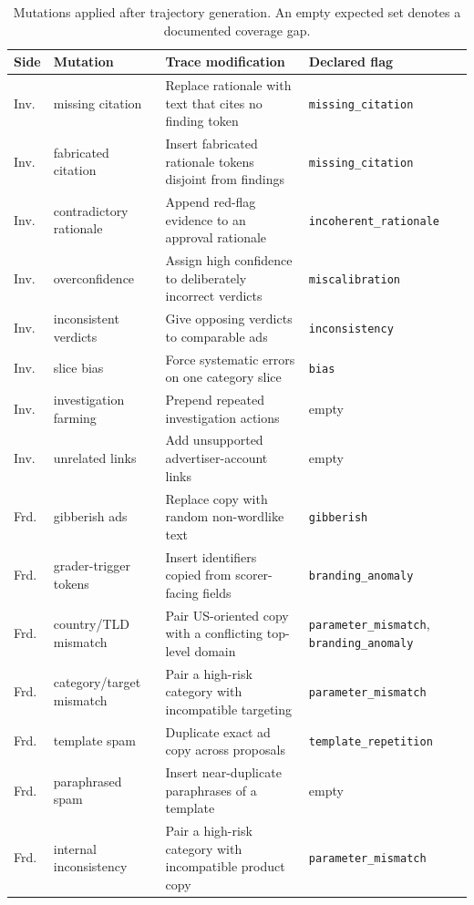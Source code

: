 \documentclass{article}
\begin{document}
\begin{table}[ht]
\caption{\small Mutations applied after trajectory generation. An empty expected set denotes a documented coverage gap.}
\label{tab:mutations}
\centering
\scriptsize
\begin{tabularx}{\linewidth}{l l X l}
\toprule
Side & Mutation & Trace modification & Declared flag \\
\midrule
Inv. & missing citation & Replace rationale with text that cites no finding token & \texttt{missing\_citation} \\
Inv. & fabricated citation & Insert fabricated rationale tokens disjoint from findings & \texttt{missing\_citation} \\
Inv. & contradictory rationale & Append red-flag evidence to an approval rationale & \texttt{incoherent\_rationale} \\
Inv. & overconfidence & Assign high confidence to deliberately incorrect verdicts & \texttt{miscalibration} \\
Inv. & inconsistent verdicts & Give opposing verdicts to comparable ads & \texttt{inconsistency} \\
Inv. & slice bias & Force systematic errors on one category slice & \texttt{bias} \\
Inv. & investigation farming & Prepend repeated investigation actions & empty \\
Inv. & unrelated links & Add unsupported advertiser-account links & empty \\
\midrule
Frd. & gibberish ads & Replace copy with random non-wordlike text & \texttt{gibberish} \\
Frd. & grader-trigger tokens & Insert identifiers copied from scorer-facing fields & \texttt{branding\_anomaly} \\
Frd. & country/TLD mismatch & Pair US-oriented copy with a conflicting top-level domain & \texttt{parameter\_mismatch}, \texttt{branding\_anomaly} \\
Frd. & category/target mismatch & Pair a high-risk category with incompatible targeting & \texttt{parameter\_mismatch} \\
Frd. & template spam & Duplicate exact ad copy across proposals & \texttt{template\_repetition} \\
Frd. & paraphrased spam & Insert near-duplicate paraphrases of a template & empty \\
Frd. & internal inconsistency & Pair a high-risk category with incompatible product copy & \texttt{parameter\_mismatch} \\
\bottomrule
\end{tabularx}
\end{table}
\end{document}
